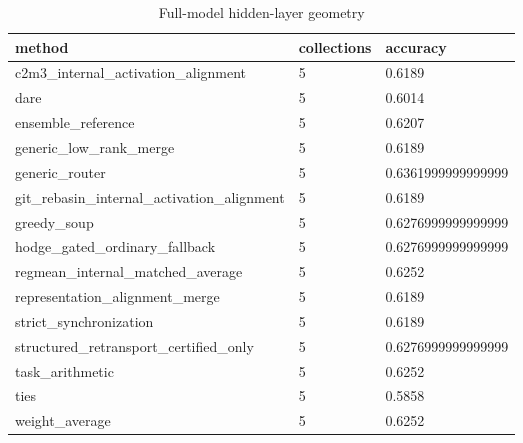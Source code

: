\begin{table}[t]
\centering
\caption{Full-model hidden-layer geometry}
\begin{tabular}{lll}
\toprule
method & collections & accuracy \\
\midrule
c2m3\_internal\_activation\_alignment & 5 & 0.6189 \\
dare & 5 & 0.6014 \\
ensemble\_reference & 5 & 0.6207 \\
generic\_low\_rank\_merge & 5 & 0.6189 \\
generic\_router & 5 & 0.6361999999999999 \\
git\_rebasin\_internal\_activation\_alignment & 5 & 0.6189 \\
greedy\_soup & 5 & 0.6276999999999999 \\
hodge\_gated\_ordinary\_fallback & 5 & 0.6276999999999999 \\
regmean\_internal\_matched\_average & 5 & 0.6252 \\
representation\_alignment\_merge & 5 & 0.6189 \\
strict\_synchronization & 5 & 0.6189 \\
structured\_retransport\_certified\_only & 5 & 0.6276999999999999 \\
task\_arithmetic & 5 & 0.6252 \\
ties & 5 & 0.5858 \\
weight\_average & 5 & 0.6252 \\
\bottomrule
\end{tabular}
\end{table}
